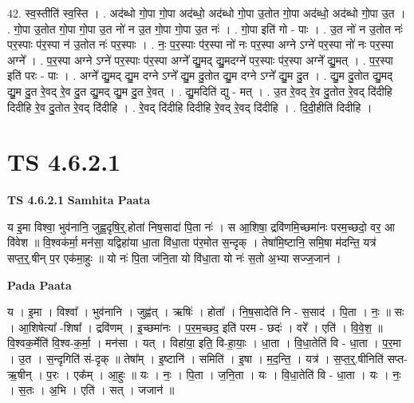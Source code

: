 \documentclass[17pt]{extarticle}
\begin{document}
42. स्व॒स्तीति॑ स्व॒स्ति । . अद॑ब्धो गो॒पा गो॒पा अद॑ब्धो॒ अद॑ब्धो गो॒पा उ॒तोत गो॒पा अद॑ब्धो॒ अद॑ब्धो गो॒पा उ॒त । . गो॒पा उ॒तोत गो॒पा गो॒पा उ॒त नो॑ न उ॒त गो॒पा गो॒पा उ॒त नः॑ । . गो॒पा इति॑ गो - पाः । . उ॒त नो॑ न उ॒तोत नः॑ पर॒स्पाः प॑र॒स्पा न॑ उ॒तोत नः॑ पर॒स्पाः । . नः॒ प॒र॒स्पाः प॑र॒स्पा नो॑ नः पर॒स्पा अग्ने ऽग्ने॑ पर॒स्पा नो॑ नः पर॒स्पा अग्ने᳚ । . प॒र॒स्पा अग्ने ऽग्ने॑ पर॒स्पाः प॑र॒स्पा अग्ने᳚ द्यु॒मद् द्यु॒मदग्ने॑ पर॒स्पाः प॑र॒स्पा अग्ने᳚ द्यु॒मत् । . प॒र॒स्पा इति॑ परः - पाः । . अग्ने᳚ द्यु॒मद् द्यु॒म दग्ने ऽग्ने᳚ द्यु॒म दु॒तोत द्यु॒म दग्ने ऽग्ने᳚ द्यु॒म दु॒त । . द्यु॒म दु॒तोत द्यु॒मद् द्यु॒म दु॒त रे॒वद् रे॒व दु॒त द्यु॒मद् द्यु॒म दु॒त रे॒वत् । . द्यु॒मदिति॑ द्यु - मत् । . उ॒त रे॒वद् रे॒व दु॒तोत रे॒वद् दि॑दीहि दिदीहि रे॒व दु॒तोत रे॒वद् दि॑दीहि । . रे॒वद् दि॑दीहि दिदीहि रे॒वद् रे॒वद् दि॑दीहि । . दि॒दी॒हीति॑ दिदीहि । \newline
\pagebreak
{}

\section{ TS 4.6.2.1 }

\textbf{TS 4.6.2.1 } \newline
\textbf{Samhita Paata} \newline

य इ॒मा विश्वा॒ भुव॑नानि॒ जुह्व॒दृषि॒र्॒.होता॑ निष॒सादा॑ पि॒ता नः॑ । स आ॒शिषा॒ द्रवि॑णमि॒च्छमा॑नः परम॒च्छदो॒ वर॒ आ वि॑वेश ॥ वि॒श्वक॑र्मा॒ मन॑सा॒ यद्विहा॑या धा॒ता वि॑धा॒ता प॑र॒मोत स॒न्दृक् । तेषा॑मि॒ष्टानि॒ समि॒षा म॑दन्ति॒ यत्र॑ सप्त॒र्॒.षीन् प॒र एक॑मा॒हुः ॥ यो नः॑ पि॒ता ज॑नि॒ता यो वि॑धा॒ता यो नः॑ स॒तो अ॒भ्या सज्ज॒जान॑ । \newline

\textbf{Pada Paata} \newline

य । इ॒मा । विश्वा᳚ । भुव॑नानि । जुह्व॑त् । ऋषिः॑ । होता᳚ । नि॒ष॒सादेति॑ नि - स॒साद॑ । पि॒ता । नः॒ ॥ सः । आ॒शिषेत्या᳚ -शिषा᳚ । द्रवि॑णम् । इ॒च्छमा॑नः । प॒र॒म॒च्छद॒ इति॑ परम - छदः॑ । वरे᳚ । एति॑ । वि॒वे॒श॒ ॥ वि॒श्वक॒र्मेति॑ वि॒श्व-क॒र्मा॒ । मन॑सा । यत् । विहा॑या॒ इति॒ वि-हा॒याः॒ । धा॒ता । वि॒धा॒तेति॑ वि - धा॒ता । प॒र॒मा । उ॒त । स॒न्दृगिति॑ सं-दृक् ॥ तेषा᳚म् । इ॒ष्टानि॑ । समिति॑ । इ॒षा । म॒द॒न्ति॒ । यत्र॑ । स॒प्त॒र्॒.षीनिति॑ सप्त-ऋ॒षीन् । प॒रः । एक᳚म् । आ॒हुः ॥ यः । नः॒ । पि॒ता । ज॒नि॒ता । यः । वि॒धा॒तेति॑ वि - धा॒ता । यः । नः॒ । स॒तः । अ॒भि । एति॑ । सत् । जजान॑ ॥  \newline
\end{document}
